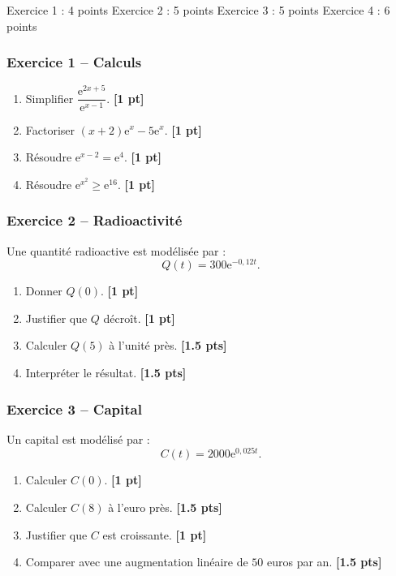 \documentclass[11pt,a4paper]{article}
\newcommand{\e}{\mathrm{e}}
\newcommand{\pts}[1]{\hfill \textbf{[#1 pt]}}
\newcommand{\ptss}[1]{\hfill \textbf{[#1 pts]}}
\begin{document}
\begin{baremebox}
Exercice 1 : 4 points \quad
Exercice 2 : 5 points \quad
Exercice 3 : 5 points \quad
Exercice 4 : 6 points
\end{baremebox}

\subsubsection*{Exercice 1 -- Calculs}

\begin{enumerate}
    \item Simplifier $\dfrac{\e^{2x+5}}{\e^{x-1}}$. \pts{1}
    \item Factoriser $(x+2)\e^x-5\e^x$. \pts{1}
    \item Résoudre $\e^{x-2}=\e^{4}$. \pts{1}
    \item Résoudre $\e^{x^2}\geq \e^{16}$. \pts{1}
\end{enumerate}

\subsubsection*{Exercice 2 -- Radioactivité}

Une quantité radioactive est modélisée par :
\[
Q(t)=300\e^{-0,12t}.
\]
\begin{enumerate}
    \item Donner $Q(0)$. \pts{1}
    \item Justifier que $Q$ décroît. \pts{1}
    \item Calculer $Q(5)$ à l'unité près. \ptss{1.5}
    \item Interpréter le résultat. \ptss{1.5}
\end{enumerate}

\subsubsection*{Exercice 3 -- Capital}

Un capital est modélisé par :
\[
C(t)=2000\e^{0,025t}.
\]
\begin{enumerate}
    \item Calculer $C(0)$. \pts{1}
    \item Calculer $C(8)$ à l'euro près. \ptss{1.5}
    \item Justifier que $C$ est croissante. \pts{1}
    \item Comparer avec une augmentation linéaire de $50$ euros par an. \ptss{1.5}
\end{enumerate}
\end{document}

